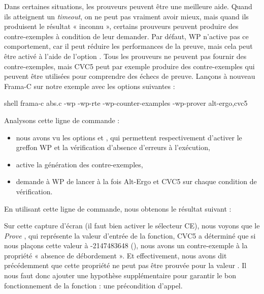 Dans certaines situations, les prouveurs peuvent être une meilleure aide. Quand
ils atteignent un \textit{timeout}, on ne peut pas vraiment avoir mieux, mais
quand ils produisent le résultat « inconnu », certains prouveurs peuvent
produire des contre-exemples à condition de leur demander. Par défaut, WP
n'active pas ce comportement, car il peut réduire les performances de la preuve,
mais cela peut être activé à l'aide de l'option 
. Tous les prouveurs ne peuvent pas fournir des
contre-exemples, mais CVC5 peut par exemple produire des contre-exemples qui
peuvent être utilisées pour comprendre des échecs de preuve. Lançons à nouveau
Frama-C sur notre exemple avec les options suivantes :
\begin{CodeBlock}{shell}
frama-c abs.c -wp -wp-rte -wp-counter-examples -wp-prover alt-ergo,cvc5
\end{CodeBlock}


Analysons cette ligne de commande :
\begin{itemize}
  \item nous avons vu les options  et , qui
        permettent respectivement d'activer le greffon WP et la vérification
        d'absence d'erreurs à l'exécution,
  \item {} active la génération des
        contre-exemples,
  \item {} demande à WP de lancer à la fois
        Alt-Ergo et CVC5 sur chaque condition de vérification.
\end{itemize}


En utilisant cette ligne de commande, nous obtenons le résultat suivant :




Sur cette capture d'écran (il faut bien activer le sélecteur CE), nous voyons
que le \textit{Prove} , qui représente la valeur d'entrée de la
fonction, CVC5 a déterminé que si nous plaçons cette valeur à -2147483648
(), nous avons un contre-exemple à la propriété
« absence de débordement ». Et effectivement, nous avons dit précédemment que
cette propriété ne peut pas être prouvée pour la valeur .
Il nous faut donc ajouter une hypothèse supplémentaire pour garantir le bon
fonctionnement de la fonction : une précondition d'appel.





